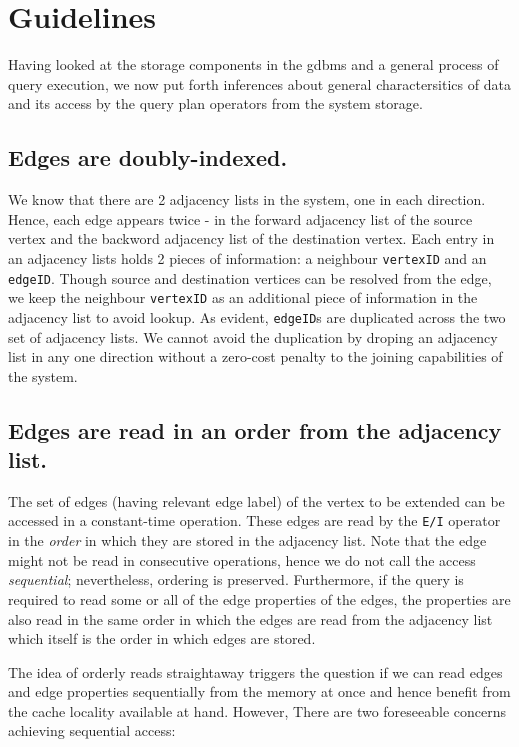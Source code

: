 \section{Guidelines}
\label{sec:guidelines}

Having looked at the storage components in the \gls{gdbms} and a general process of query execution, we now put forth inferences about general charactersitics of data and its access by the query plan operators from the system storage.

\subsection{Edges are doubly-indexed.}

We know that there are 2 adjacency lists in the system, one in each direction. Hence, each edge appears twice - in the forward adjacency list of the source vertex and the backword adjacency list of the destination vertex. Each entry in an adjacency lists holds 2 pieces of information: a neighbour \texttt{vertexID} and an \texttt{edgeID}. Though source and destination vertices can be resolved from the edge, we keep the neighbour \texttt{vertexID} as an additional piece of information in the adjacency list to avoid lookup. As evident, \texttt{edgeID}s are duplicated across the two set of adjacency lists. We cannot avoid the duplication by droping an adjacency list in any one direction without a zero-cost penalty to the joining capabilities of the system.

\subsection{Edges are read in an order from the adjacency list.}

The set of edges (having relevant edge label) of the vertex to be extended can be accessed in a constant-time operation. These edges are read by the \texttt{E/I} operator in the \emph{order} in which they are stored in the adjacency list. Note that the edge might not be read in consecutive operations, hence we do not call the access \emph{sequential}; nevertheless, ordering is preserved. Furthermore, if the query is required to read some or all of the edge properties of the edges, the properties are also read in the same order in which the edges are read from the adjacency list which itself is the order in which edges are stored.

The idea of orderly reads straightaway triggers the question if we can read edges and edge properties sequentially from the memory at once and hence benefit from the cache locality available at hand. However, There are two foreseeable concerns achieving sequential access: 

